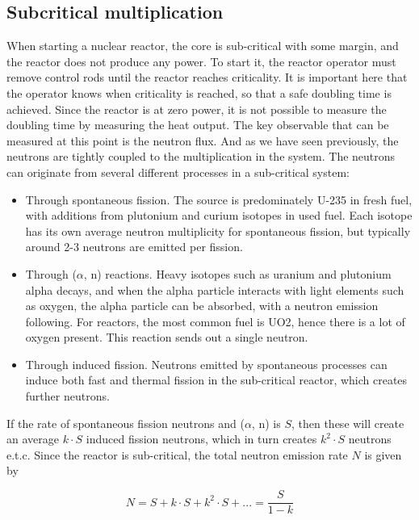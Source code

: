 
\subsection{Subcritical multiplication}
When starting a nuclear reactor, the core is sub-critical with some margin, and the reactor does not produce any power. To start it, the reactor operator must remove control rods until the reactor reaches criticality. It is important here that the operator knows when criticality is reached, so that a safe doubling time is achieved. Since the reactor is at zero power, it is not possible to measure the doubling time by measuring the heat output. The key observable that can be measured at this point is the neutron flux. And as we have seen previously, the neutrons are tightly coupled to the multiplication in the system. The neutrons can originate from several different processes in a sub-critical system:

\begin{itemize}
\item Through spontaneous fission. The source is predominately U-235 in fresh fuel, with additions from plutonium and curium isotopes in used fuel. Each isotope has its own average neutron multiplicity for spontaneous fission, but typically around 2-3 neutrons are emitted per fission.

\item Through ($\alpha$, n) reactions. Heavy isotopes such as uranium and plutonium alpha decays, and when the alpha particle interacts with light elements such as oxygen, the alpha particle can be absorbed, with a neutron emission following. For reactors, the most common fuel is UO2, hence there is a lot of oxygen present. This reaction sends out a single neutron.

\item Through induced fission. Neutrons emitted by spontaneous processes can induce both fast and thermal fission in the sub-critical reactor, which creates further neutrons. 
\end{itemize}

If the rate of spontaneous fission neutrons and ($\alpha$, n) is $S$, then these will create an average $k \cdot S$ induced fission neutrons, which in turn creates $k^2 \cdot S$ neutrons e.t.c. Since the reactor is sub-critical, the total neutron emission rate $N$ is given by

\begin{equation} \label{eq:total_neutron}
N = S + k \cdot S + k^2 \cdot S + ... = \frac{S}{1-k} 
\end{equation}

